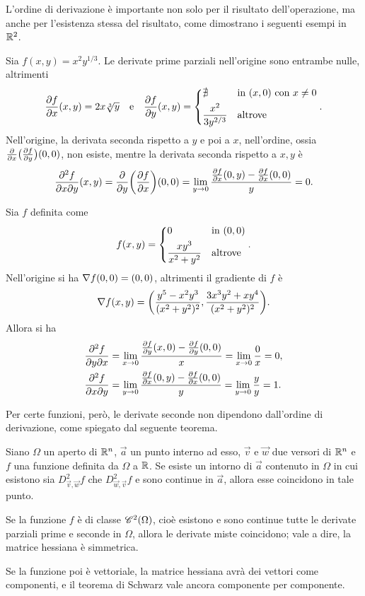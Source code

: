 L'ordine di derivazione è importante non solo per il risultato dell'operazione, ma anche per l'esistenza stessa del risultato, come dimostrano i seguenti esempi in $\R^2$.
\begin{esempio} \label{es:ordine-di-derivazione-1}
	Sia $f(x,y)=x^2y^{1/3}$. Le derivate prime parziali nell'origine sono entrambe nulle, altrimenti
	\[
	\drp{f}{x}(x,y)=2x\sqrt[3]{y}\qtext{e}\drp{f}{y}(x,y)=\begin{dcases*}\nexists&in $(x,0)$ con $x\neq 0$\\\frac{x^2}{3y^{2/3}}&altrove\end{dcases*}.
	\]
	Nell'origine, la derivata seconda rispetto a $y$ e poi a $x$, nell'ordine, ossia $\drp{}{x}\big(\drp{f}{y}\big)(0,0)$, non esiste, mentre la derivata seconda rispetto a $x,y$ è
	\[
	\frac{\partial^2f}{\partial x\partial y}(x,y)=\drp{}{y}\bigg(\drp{f}{x}\bigg)(0,0)=\lim_{y\to 0}\frac{\drp{f}{x}(0,y)-\drp{f}{x}(0,0)}{y}=0.
	\]
\end{esempio}
\begin{esempio} \label{es:ordine-di-derivazione-2}
	Sia $f$ definita come
	\[
	f(x,y)=\begin{dcases*}0&in $(0,0)$\\\frac{xy^3}{x^2+y^2}&altrove\end{dcases*}.
	\]
	Nell'origine si ha $\grad f(0,0)=(0,0)$, altrimenti il gradiente di $f$ è
	\[
	\grad f(x,y)=\bigg(\frac{y^5-x^2y^3}{(x^2+y^2)^2},\frac{3x^3y^2+xy^4}{(x^2+y^2)^2}\bigg).
	\]
	Allora si ha
	\begin{align*}
	&\frac{\partial^2f}{\partial y\partial x}=\lim_{x\to 0}\frac{\drp{f}{y}(x,0)-\drp{f}{y}(0,0)}{x}=\lim_{x\to 0}\frac0{x}=0,\\
	&\frac{\partial^2f}{\partial x\partial y}=\lim_{y\to 0}\frac{\drp{f}{x}(0,y)-\drp{f}{x}(0,0)}{y}=\lim_{y\to 0}\frac{y}{y}=1.
	\end{align*}
\end{esempio}
Per certe funzioni, però, le derivate seconde non dipendono dall'ordine di derivazione, come spiegato dal seguente teorema.
\begin{teorema}[di Schwartz] \label{t:schwarz}
Siano $\Omega$ un aperto di $\R^n$, $\vec a$ un punto interno ad esso, $\vec v$ e $\vec w$ due versori di $\R^n$ e $f$ una funzione definita da $\Omega$ a $\R$. Se esiste un intorno di $\vec a$ contenuto in $\Omega$ in cui esistono sia $D^2_{\vec v,\vec w}f$ che $D^2_{\vec w,\vec v}f$ e sono continue in $\vec a$, allora esse coincidono in tale punto.
\end{teorema}
\begin{corollario}
Se la funzione $f$ è di classe $\cont[2]{\Omega}$, cioè esistono e sono continue tutte le derivate parziali prime e seconde in $\Omega$, allora le derivate miste coincidono; vale a dire, la matrice hessiana è simmetrica.
\end{corollario}
Se la funzione poi è vettoriale, la matrice hessiana avrà dei vettori come componenti, e il teorema di Schwarz vale ancora componente per componente.%

